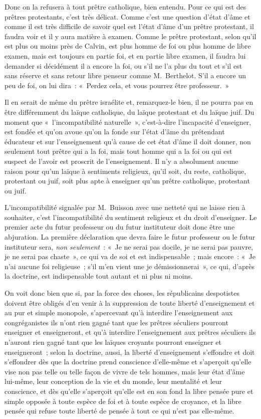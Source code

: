 \documentclass[french,twoside]{book} %
\begin{document}
 Donc on la refusera à tout prêtre catholique, bien entendu. Pour ce qui est des prêtres protestants, c’est très délicat. Comme c’est une question d’état d’âme et comme il est très difficile de savoir quel est l’état d’âme d’un prêtre protestant, il faudra voir et il y aura matière à examen. Comme le prêtre protestant, selon qu’il est plus ou moins près de Calvin, est plus homme de foi ou plus homme de libre examen, mais est toujours en partie foi, et en partie libre examen, il faudra lui demander si décidément il a encore la foi, ou s’il ne l’a plus du tout et s’il est sans réserve et sans retour libre penseur comme M. Berthelot. S’il a encore un peu de foi, on lui dira : « Perdez cela, et vous pourrez être professeur. »\par
Il en serait de même du prêtre israélite et, remarquez-le bien, il ne pourra pas en être différemment du laïque catholique, du laïque protestant et du laïque juif. Du moment que « l’incompatibilité naturelle », c’est-à-dire l’incapacité d’enseigner, est fondée et qu’on avoue qu’on la fonde sur l’état d’âme du prétendant éducateur et sur l’enseignement qu’à cause de cet état d’âme il doit donner, non seulement tout prêtre qui a la foi, mais tout homme qui a la foi ou qui est suspect de l’avoir est proscrit de l’enseignement. Il n’y a absolument aucune raison pour qu’un laïque à  sentiments religieux, qu’il soit, du reste, catholique, protestant ou juif, soit plus apte à enseigner qu’un prêtre catholique, protestant ou juif.\par
L’incompatibilité signalée par M. Buisson avec une netteté qui ne laisse rien à souhaiter, c’est l’incompatibilité du sentiment religieux et du droit d’enseigner. Le premier acte du futur professeur ou du futur instituteur doit donc être une abjuration. La première déclaration que devra faire le futur professeur ou le futur instituteur sera, {\itshape non seulement} : « Je ne serai pas docile, je ne serai pas pauvre, je ne serai pas chaste », ce qui va de soi et est indispensable ; mais encore : « Je n’ai aucune foi religieuse ; s’il m’en vient une je démissionnerai », ce qui, d’après la doctrine, est indispensable tout autant et ni plus ni moins.\par
On voit donc bien que si, par la force des choses, les républicains despotistes doivent être obligés d’en venir à la suppression de toute liberté d’enseignement et au pur et simple monopole, s’apercevant qu’à interdire l’enseignement aux congréganistes ils n’ont rien gagné tant que les prêtres séculiers pourront enseigner et enseigneront, et qu’à interdire l’enseignement aux prêtres séculiers ils n’auront rien gagné tant que les laïques croyants pourront enseigner et enseigneront ; selon la doctrine, aussi, la liberté d’enseignement  s’effondre et doit s’effondrer dès que la doctrine prend conscience d’elle-même et s’aperçoit qu’elle vise non pas telle ou telle façon de vivre de tels hommes, mais leur état d’âme lui-même, leur conception de la vie et du monde, leur mentalité et leur conscience, et dès qu’elle s’aperçoit qu’elle est en son fond la libre pensée pure et simple opposée à toute espèce de foi et à toute espèce de croyance, et la libre pensée qui refuse toute liberté de pensée à tout ce qui n’est pas elle-même.\par
\end{document}

